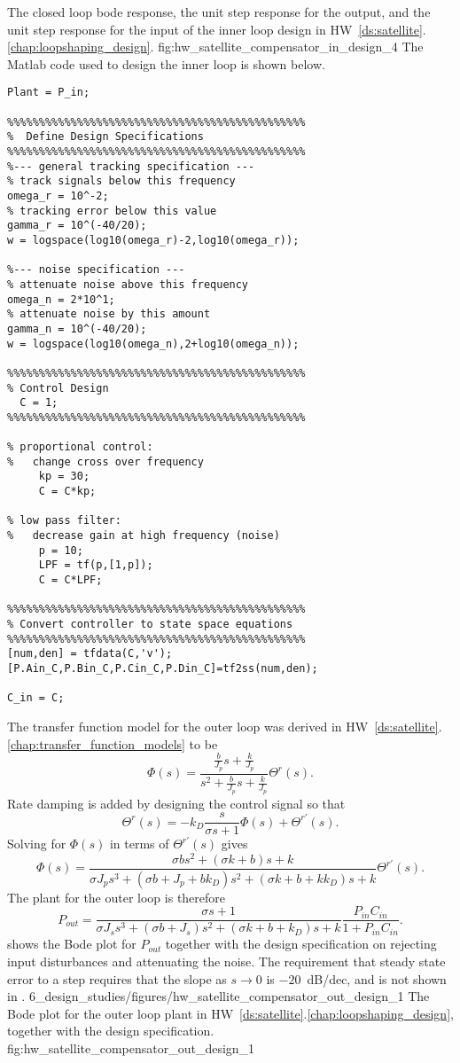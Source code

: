    	{The closed loop bode response, the unit step response for the output, and the unit step response for the input of the inner loop design in HW~\ref{ds:satellite}.\ref{chap:loopshaping_design}.}
   	{fig:hw_satellite_compensator_in_design_4}
The Matlab code used to design the inner loop is shown below.
\begin{lstlisting}
Plant = P_in;

%%%%%%%%%%%%%%%%%%%%%%%%%%%%%%%%%%%%%%%%%%%%%%%
%  Define Design Specifications
%%%%%%%%%%%%%%%%%%%%%%%%%%%%%%%%%%%%%%%%%%%%%%%
%--- general tracking specification ---
% track signals below this frequency
omega_r = 10^-2; 
% tracking error below this value
gamma_r = 10^(-40/20);  
w = logspace(log10(omega_r)-2,log10(omega_r));
        
%--- noise specification ---
% attenuate noise above this frequency
omega_n = 2*10^1;  
% attenuate noise by this amount
gamma_n = 10^(-40/20);   
w = logspace(log10(omega_n),2+log10(omega_n));

%%%%%%%%%%%%%%%%%%%%%%%%%%%%%%%%%%%%%%%%%%%%%%%
% Control Design
  C = 1;
%%%%%%%%%%%%%%%%%%%%%%%%%%%%%%%%%%%%%%%%%%%%%%%

% proportional control: 
%   change cross over frequency
     kp = 30;
     C = C*kp;
     
% low pass filter: 
%   decrease gain at high frequency (noise)
     p = 10;
     LPF = tf(p,[1,p]);
     C = C*LPF;
       
%%%%%%%%%%%%%%%%%%%%%%%%%%%%%%%%%%%%%%%%%%%%%%%
% Convert controller to state space equations 
%%%%%%%%%%%%%%%%%%%%%%%%%%%%%%%%%%%%%%%%%%%%%%%
[num,den] = tfdata(C,'v');
[P.Ain_C,P.Bin_C,P.Cin_C,P.Din_C]=tf2ss(num,den);

C_in = C;
\end{lstlisting}


The transfer function model for the outer loop was derived in HW~\ref{ds:satellite}.\ref{chap:transfer_function_models} to be
\[
\Phi(s) = \frac{\frac{b}{J_p}s+\frac{k}{J_p}}{s^2+\frac{b}{J_p}s+\frac{k}{J_p}}\Theta^r(s).
\]
Rate damping is added by designing the control signal so that
\[
\Theta^r(s) = -k_D\frac{s}{\sigma s+1}\Phi(s) + \Theta^{r'}(s).
\]
Solving for $\Phi(s)$ in terms of $\Theta^{r'}(s)$ gives
\[
\Phi(s)  = \frac{\sigma b s^2 + (\sigma k + b)s + k}{\sigma J_p s^3 + (\sigma b + J_p + bk_D)s^2+(\sigma k + b + kk_D)s + k}\Theta^{r'}(s).
\]
The plant for the outer loop is therefore
\[
P_{out} =  \frac{\sigma s + 1}{\sigma J_s s^3 + (\sigma b + J_s)s^2+(\sigma k + b + k_D)s + k}\frac{P_{in}C_{in}}{1+P_{in}C_{in}}.
\]
 shows the Bode plot for $P_{out}$ together with the design specification on rejecting input disturbances and attenuating the noise.  The requirement that steady state error to a step requires that the slope as $s\to 0$ is $-20$~dB/dec, and is not shown in .
%
	{6_design_studies/figures/hw_satellite_compensator_out_design_1}
   	{The Bode plot for the outer loop plant in HW~\ref{ds:satellite}.\ref{chap:loopshaping_design}, together with the design specification.}
   	{fig:hw_satellite_compensator_out_design_1}

